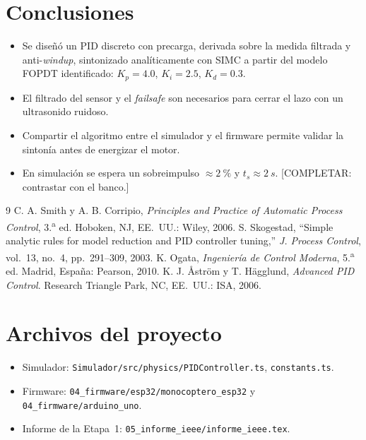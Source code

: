 \documentclass[conference,10pt]{IEEEtran}
\begin{document}
\section{Conclusiones}
\begin{itemize}
\item Se diseñó un PID discreto con precarga, derivada sobre la medida filtrada y anti-\textit{windup}, sintonizado analíticamente con SIMC a partir del modelo FOPDT identificado: $K_p=4.0$, $K_i=2.5$, $K_d=0.3$.
\item El filtrado del sensor y el \textit{failsafe} son necesarios para cerrar el lazo con un ultrasonido ruidoso.
\item Compartir el algoritmo entre el simulador y el firmware permite validar la sintonía antes de energizar el motor.
\item En simulación se espera un sobreimpulso $\approx\SI{2}{\percent}$ y $t_s\approx\SI{2}{s}$. [COMPLETAR: contrastar con el banco.]
\end{itemize}

\begin{thebibliography}{9}
 C. A. Smith y A. B. Corripio, \textit{Principles and Practice of Automatic Process Control}, 3.\textsuperscript{a} ed. Hoboken, NJ, EE.~UU.: Wiley, 2006.
 S. Skogestad, ``Simple analytic rules for model reduction and PID controller tuning,'' \textit{J. Process Control}, vol.~13, no.~4, pp.~291--309, 2003.
 K. Ogata, \textit{Ingeniería de Control Moderna}, 5.\textsuperscript{a} ed. Madrid, España: Pearson, 2010.
 K. J. Åström y T. Hägglund, \textit{Advanced PID Control}. Research Triangle Park, NC, EE.~UU.: ISA, 2006.
\end{thebibliography}

\appendices
\section{Archivos del proyecto}
\begin{itemize}
\item Simulador: \texttt{Simulador/src/physics/PIDController.ts}, \texttt{constants.ts}.
\item Firmware: \texttt{04\_firmware/esp32/monocoptero\_esp32} y \texttt{04\_firmware/arduino\_uno}.
\item Informe de la Etapa~1: \texttt{05\_informe\_ieee/informe\_ieee.tex}.
\end{itemize}
\end{document}
